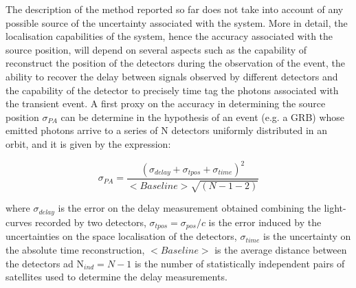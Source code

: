 \documentclass[]{spie}  %
\def \her{\textit{HERMES}\xspace}
\begin{document}
The description of the method reported so far does not take into account of any possible source of the uncertainty associated with the system. More in detail, the localisation capabilities of the system, hence the accuracy associated with the source position, will depend on several aspects such as the capability of reconstruct the position of the detectors during the observation of the event, the ability to recover the delay between signals observed by different detectors and the capability of the detector to precisely time tag the photons associated with the transient event. 
A first proxy on the accuracy in determining the source position $\sigma_{PA}$ can be determine in the hypothesis of an event (e.g. a GRB) whose emitted photons arrive to a series of N detectors uniformly distributed in an orbit, and it is given by the expression:

\begin{equation}
\label{eq:sigma_pos}
\sigma_{PA} = \dfrac{(\sigma_{delay}+\sigma_{tpos}+\sigma_{time})^2}{<Baseline>\sqrt{(N-1-2)}}
\end{equation}

where $\sigma_{delay}$ is the error on the delay measurement obtained combining the light-curves recorded by two detectors, $\sigma_{tpos}=\sigma_{pos}/c$ is the error induced by the uncertainties on the space localisation of the detectors, $\sigma_{time}$ is the uncertainty on the absolute time reconstruction, $<Baseline>$ is the average distance between the detectors ad N$_{ind} = N-1$ is the number of statistically independent pairs of satellites used to determine the delay measurements.\\

	
\end{document}
